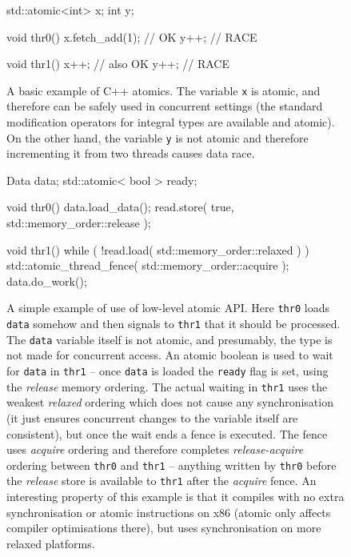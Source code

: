 \begin{figure}[t]
  \begin{cppcode}
    std::atomic<int> x;
    int y;
  \end{cppcode}
  \begin{multicols}{2}
    \begin{cppcode}
      void thr0() {
        x.fetch_add(1); // OK
        y++; // RACE
      }
    \end{cppcode}
    \columnbreak
    \begin{cppcode}
      void thr1() {
        x++; // also OK
        y++; // RACE
      }
    \end{cppcode}
  \end{multicols}
  \vspace{-4.5ex}
  \caption{A basic example of C++ atomics.
      The variable \texttt{x} is atomic, and therefore can be safely used in
      concurrent settings (the standard modification operators for integral types
      are available and atomic).
      On the other hand, the variable \texttt{y} is not atomic and therefore
      incrementing it from two threads causes data race.
  }\label{fig:prel:cppatomic0}
\end{figure}

\begin{figure}[t]
  \begin{cppcode}
    Data data;
    std::atomic< bool > ready;

    void thr0() {
      data.load_data();
      read.store( true, std::memory_order::release );
    }

    void thr1() {
      while ( !read.load( std::memory_order::relaxed ) )
      { }
      std::atomic_thread_fence( std::memory_order::acquire );
      data.do_work();
    }
  \end{cppcode}
  \vspace{-2ex}
  \caption{A simple example of use of low-level atomic API.
      Here \texttt{thr0} loads \texttt{data} somehow and then signals to
      \texttt{thr1} that it should be processed.
      The \texttt{data} variable itself is not atomic, and presumably, the type
      is not made for concurrent access.
      An atomic boolean is used to wait for \texttt{data} in \texttt{thr1} --
      once \texttt{data} is loaded the \texttt{ready} flag is set, using the
      \emph{release} memory ordering.
      The actual waiting in \texttt{thr1} uses the weakest \emph{relaxed}
      ordering which does not cause any synchronisation (it just ensures
      concurrent changes to the variable itself are consistent), but once the
      wait ends a fence is executed.
      The fence uses \emph{acquire} ordering and therefore completes
      \emph{release-acquire} ordering between \texttt{thr0} and \texttt{thr1}
      -- anything written by \texttt{thr0} before the \emph{release} store is
      available to \texttt{thr1} after the \emph{acquire} fence.
      An interesting property of this example is that it compiles with no extra
      synchronisation or atomic instructions on x86 (atomic only affects
      compiler optimisations there), but uses synchronisation on more relaxed
      platforms.
  }\label{fig:prel:cppatomic1}
\end{figure}

